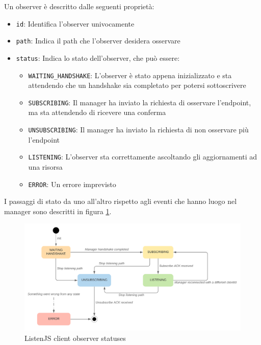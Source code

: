 \documentclass[12pt,a4paper,openright,twoside]{report}
\begin{document}
Un observer è descritto dalle seguenti proprietà:
\begin{itemize}
\item \lstinline{id}: Identifica l'observer univocamente
\item \lstinline{path}: Indica il path che l'observer desidera osservare
\item \lstinline{status}: Indica lo stato dell'observer, che può essere:
  \begin{itemize}
  \item \lstinline{WAITING_HANDSHAKE}: L'observer è stato appena inizializzato e sta attendendo che un handshake sia completato per potersi sottoscrivere
  \item \lstinline{SUBSCRIBING}: Il manager ha inviato la richiesta di osservare l'endpoint, ma sta attendendo di ricevere una conferma
  \item \lstinline{UNSUBSCRIBING}: Il manager ha inviato la richiesta di non osservare più l'endpoint
  \item \lstinline{LISTENING}: L'observer sta correttamente ascoltando gli aggiornamenti ad una risorsa
  \item \lstinline{ERROR}: Un errore imprevisto
  \end{itemize}
\end{itemize}

I passaggi di stato da uno all'altro rispetto agli eventi che hanno luogo nel manager sono descritti in figura \ref{fig:observer_statuses}.

\begin{figure}[htbp]
\centering
\includegraphics[width=.9\textwidth]{assets/observer_statuses.png}
\caption{ListenJS client observer statuses}
\label{fig:observer_statuses}
\end{figure}
\end{document}
